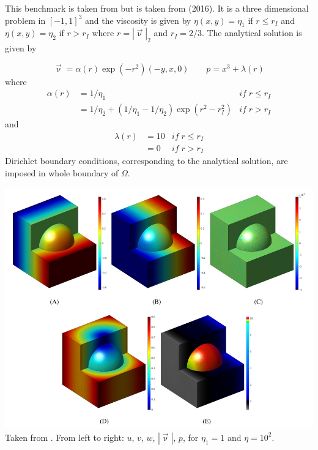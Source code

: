 This benchmark is taken from \textcite{sedu23} 
but is taken from \textcite{kigr16} (2016).
It is a three dimensional problem in $[-1,1]^3$  
and the viscosity is given by
$\eta(x,y)=\eta_1$ if $r\le r_I$
and $\eta(x,y)=\eta_2$ if $r > r_I$
where $r=|\vec\upnu|_2$ and $r_I=2/3$.
The analytical solution is given by

\begin{equation}
\vec\upnu = \alpha(r) \exp(-r^2) (-y,x,0)
\qquad
p = x^3 +\lambda(r)
\end{equation}
where 
\begin{align}
\alpha(r)  &= 1/\eta_1                                       & if \; r\le r_I \\
           &= 1/\eta_2 + (1/\eta_1-1/\eta_2)\exp (r^2-r_I^2) & if \; r> r_I 
\end{align}
and
\begin{align}
\lambda(r) &= 10 & if \; r\le r_I \\
           &= 0  & if \; r> r_I 
\end{align}
Dirichlet boundary conditions, corresponding to the analytical solution, are imposed in whole boundary 
of $\Omega$.

\begin{center}
\includegraphics[width=15cm]{images/mms/sedu23b}\\
{\captionfont Taken from \cite{sedu23}. From left to right: 
$u$, $v$, $w$, $|\vec\upnu|$, $p$, for $\eta_1=1$ and $\eta=10^{2}.$}
\end{center}



